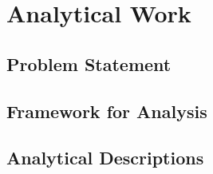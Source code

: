 \section{Analytical Work}

\subsection{Problem Statement}

\newpage

\subsection{Framework for Analysis}

\newpage

\subsection{Analytical Descriptions}

\newpage